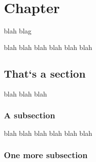 \documentclass{mai_book}
\begin{document}
\chapter{Chapter}

\begin{flushright}
blah blag
\end{flushright}

blah blah blah
\pagebreak
blah blah blah
\section{That`s a section}
blah blah blah

\subsection{A subsection}
blah blah blah
\pagebreak
blah blah blah

\subsection{One more subsection}
\end{document}
